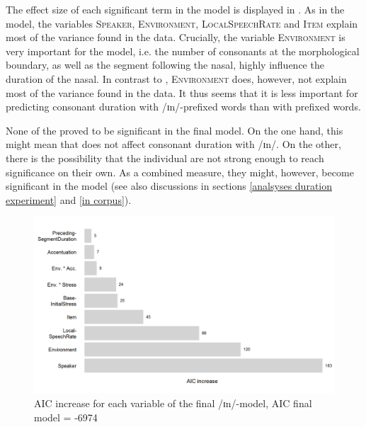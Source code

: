 
The effect size of each significant term in the model is displayed in . As in the model, the variables \textsc{Speaker}, \textsc{Environment}, \textsc{LocalSpeechRate} and \textsc{Item} explain most of the variance found in the data. Crucially, the variable \textsc{Environment} is very important for the model, i.e. the number of consonants at the morphological boundary, as well as the segment following the nasal, highly influence the duration of the nasal. In contrast to , \textsc{Environment} does, however, not explain most of the variance found in the data. It thus seems that it is less important for predicting consonant duration with /ɪn/-prefixed words than with prefixed words. 






None of the  proved to be significant in the final model. On the one hand, this might mean that  does not affect consonant duration with /ɪn/. On the other, there is the possibility that the individual  are not strong enough to reach significance on their own. As a combined  measure, they might, however, become significant in the model (see also discussions in sections \ref{analsyses duration experiment} and \ref {in corpus}).





\begin{figure}
	
	\includegraphics[scale=0.7]{images/Experiment/AICdecreaseInComplex.png}
	
	\caption{AIC increase for each variable of the final /ɪn/-model, AIC final model = -6974}
	\label{fig:Effect sizes InComplex Exp}
	
\end{figure}


